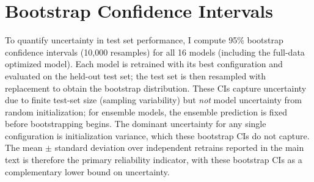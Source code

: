 \documentclass[12pt]{article}
\begin{document}
\section{Bootstrap Confidence Intervals}
\label{app:bootstrap}

To quantify uncertainty in test set performance, I compute 95\% bootstrap confidence intervals (10{,}000 resamples) for all 16 models (including the full-data optimized model).
Each model is retrained with its best configuration and evaluated on the held-out test set; the test set is then resampled with replacement to obtain the bootstrap distribution.
These CIs capture uncertainty due to finite test-set size (sampling variability) but \emph{not} model uncertainty from random initialization; for ensemble models, the ensemble prediction is fixed before bootstrapping begins.
The dominant uncertainty for any single configuration is initialization variance, which these bootstrap CIs do not capture. The mean $\pm$ standard deviation over independent retrains reported in the main text is therefore the primary reliability indicator, with these bootstrap CIs as a complementary lower bound on uncertainty.
\end{document}
